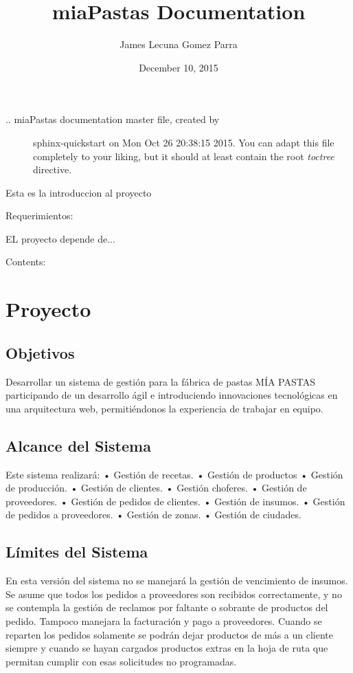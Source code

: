 \documentclass[letterpaper,10pt,english]{sphinxmanual}
\title{miaPastas Documentation}
\date{December 10, 2015}
\author{James Lecuna Gomez Parra}
\begin{document}
\maketitle
\tableofcontents
{}\label{index::doc}\begin{description}
\item[{{}.. miaPastas documentation master file, created by}] \leavevmode
sphinx-quickstart on Mon Oct 26 20:38:15 2015.
You can adapt this file completely to your liking, but it should at least
contain the root \emph{toctree} directive.

\end{description}



Esta es la introduccion al proyecto

Requerimientos:

EL proyecto depende de...

Contents:


\chapter{{}Proyecto}
\label{proyecto:mia-pastas-documentacion}\label{proyecto:proyecto}\label{proyecto::doc}

\section{Objetivos}
\label{proyecto:objetivos}
Desarrollar un sistema de gestión para la fábrica de pastas MÍA PASTAS participando de un desarrollo ágil e introduciendo innovaciones tecnológicas en una arquitectura web, permitiéndonos la experiencia de trabajar en equipo.


\section{Alcance del Sistema}
\label{proyecto:alcance-del-sistema}
Este sistema realizará:
•       Gestión de recetas.
•       Gestión de productos
•       Gestión de producción.
•       Gestión de clientes.
•       Gestión choferes.
•       Gestión de proveedores.
•       Gestión de pedidos de clientes.
•       Gestión de insumos.
•       Gestión de pedidos a proveedores.
•       Gestión de zonas.
•       Gestión de ciudades.


\section{Límites del Sistema}
\label{proyecto:limites-del-sistema}
En esta versión del  sistema no se manejará la gestión de vencimiento de insumos.
Se asume que todos los pedidos a proveedores son recibidos correctamente, y no se contempla la gestión de reclamos por faltante o sobrante de productos del pedido.
Tampoco manejara la facturación y pago a proveedores.
Cuando se reparten los pedidos solamente se podrán dejar productos de más a un cliente siempre y cuando se hayan cargados productos extras en la hoja de ruta que permitan cumplir con esas solicitudes no programadas.
\end{document}
